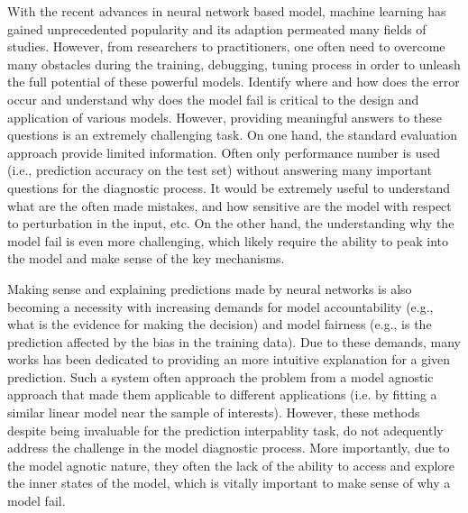 \maketitle

With the recent advances in neural network based model, machine learning has
gained unprecedented popularity and its adaption permeated many fields of studies.
%
However, from researchers to practitioners, one often need to overcome many obstacles during the training, debugging, tuning process in order to unleash the full potential of these powerful models.
%
Identify where and how does the error occur and understand why does the model fail is critical to the design and application of various models.
However, providing meaningful answers to these questions is an extremely challenging task.
On one hand, the standard evaluation approach provide limited information. Often only performance number is used (i.e., prediction accuracy on the test set) without answering many important questions for the diagnostic process. It would be extremely useful to understand what are the often made mistakes, and how sensitive are the model with respect to perturbation in the input, etc. On the other hand, the understanding why the model fail is even more challenging, which likely require the ability to peak into the model and make sense of the key mechanisms.

Making sense and explaining predictions made by neural networks is also becoming a necessity with increasing demands for model accountability (e.g., what is the evidence for making the decision) and model fairness (e.g., is the prediction affected by the bias in the training data).
%
Due to these demands, many works has been dedicated to providing an more intuitive explanation for a given prediction. Such a system often approach the problem from a model agnostic approach that made them applicable to different applications (i.e. by fitting a similar linear model near the sample of interests).
%
However, these methods despite being invaluable for the prediction interpablity task, do not adequently address the challenge in the model diagnostic process. More importantly, due to the model agnotic nature, they often the lack of the ability to access and explore the inner states of the model, which is vitally important to make sense of why a model fail.

